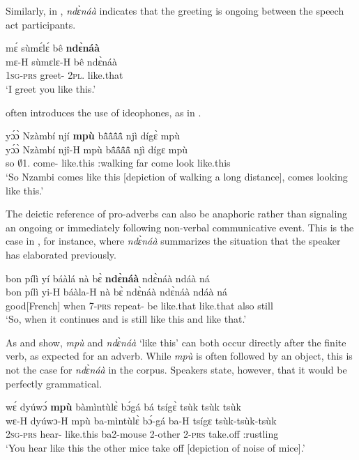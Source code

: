 \noindent Similarly, in , {\itshape ndɛ̀náà} indicates that the greeting is ongoing between the speech act participants.

\ea \label{likethis2}
  \glll     mɛ́ sùmɛ́lɛ́ bê {\bfseries ndɛ̀náà} \\
            mɛ-H sùmɛlɛ-H bê ndɛ̀náà \\
              1\textsc{sg}-\textsc{prs} greet-{\R} 2\textsc{pl}.{\OBJ} like.that   \\
    \trans `I greet you like this.'
\z

 often introduces the use of ideophones, as in .

\ea \label{likethis3}
  \glll yɔ́ɔ̀ Nzàmbí njí {\bfseries mpù} bã̂ã̂ã̂ã̂ njì dígɛ̀ mpù \\
        yɔ́ɔ̀ Nzàmbí njî-H mpù bã̂ã̂ã̂ã̂ njì dígɛ mpù \\
        so $\emptyset$1.{\PN} come-{\R} like.this {\IDEO}:walking far come look like.this \\
    \trans `So Nzambi comes like this [depiction of walking a long distance], comes looking like this.'
\z

\noindent The deictic reference of pro-adverbs can also be anaphoric rather than signaling an ongoing or immediately following non-verbal communicative event. This is the case in , for instance, where {\itshape ndɛ̀náà} summarizes the situation that the speaker has elaborated previously.


\ea \label{likethis4}
  \glll  bon pílì yí báàlá nà bɛ̀ {\bfseries ndɛ̀náà} ndɛ̀náà ndáà ná \\
        bon pílì yi-H báàla-H nà bɛ̀ ndɛ̀náà ndɛ̀náà ndáà ná \\
          good[French] when 7-\textsc{prs} repeat-{\R} {\COM} be like.that like.that also still  \\
    \trans `So, when it continues and is still like this and like that.'
\z

As  and  show, {\itshape mpù} and {\itshape ndɛ̀náà} `like this' can both occur directly after the finite verb, as expected for an adverb. While {\itshape mpù} is often followed by an object, this is not the case for {\itshape ndɛ̀náà} in the corpus. Speakers state, however, that it would be perfectly grammatical.

\ea \label{likethis5}
  \glll wɛ́ dyúwɔ́ {\bfseries mpù} bàmìntùlɛ̀ bɔ́gá bá tsígɛ̀ tsùk tsùk tsùk \\
         wɛ-H dyúwɔ-H mpù ba-mìntùlɛ̀ bɔ́-gá ba-H tsígɛ tsùk-tsùk-tsùk \\
        2\textsc{sg}-\textsc{prs} hear-{\R} like.this ba2-mouse 2-other 2-\textsc{prs} take.off {\IDEO}:rustling \\
    \trans `You hear like this the other mice take off [depiction of noise of mice].'
\z

